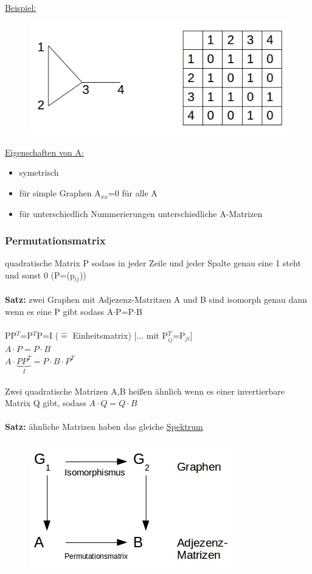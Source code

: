 \underline{Beispiel:}\\
\begin{figure}[htp]
\centering
\includegraphics[scale=1]{lectures/161021/pix/pic11.jpg}
\end{figure}

\underline{Eigenschaften von A:}
\begin{itemize}
	\item symetrisch
	\item für simple Graphen A$_{xx}$=0 für alle A
	\item für unterschiedlich Nummerierungen unterschiedliche A-Matrizen
\end{itemize}

\subsubsection{Permutationsmatrix}
quadratische Matrix P sodass in jeder Zeile und jeder Spalte genau eine 1 steht und sonst 0 (P=(p$_{ij}$))
\\\\
\textbf{Satz:} zwei Graphen mit Adjezenz-Matritzen A und B sind isomorph genau dann wenn es eine P gibt sodass A$\cdot$P=P$\cdot$B
\\\\
PP$^T$=P$^T$P=I ($\widehat{=}$ Einheitsmatrix) [... mit P$^T_{ij}$=P$_{ji}$]\\
$A \cdot P = P \cdot B$\\
$A \cdot \underbrace{PP^T}_{I}=P \cdot B \cdot P^T$
\\\\
Zwei quadratische Matrizen A,B heißen ähnlich wenn es einer invertierbare Matrix Q gibt, sodass $A \cdot Q = Q \cdot B$
\\\\
\textbf{Satz:} ähnliche Matrizen haben das gleiche \underline{Spektrum}
\begin{figure}[htp]
\centering
\includegraphics[scale=1]{lectures/161021/pix/pic12.jpg}
\end{figure}

